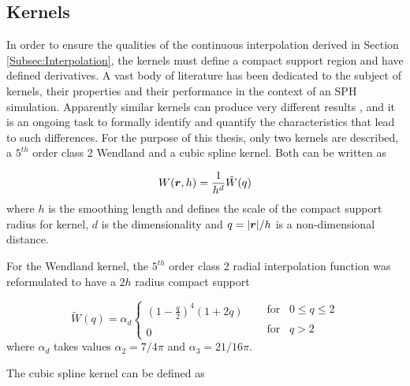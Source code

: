 \subsection{Kernels}
\label{Subsec:Kernels}

In order to ensure the qualities of the continuous interpolation derived in Section \ref{Subsec:Interpolation}, the kernels must define a compact support region and have defined derivatives. A vast body of literature has been dedicated to the subject of kernels, their properties and their performance in the context of an \ac{SPH} simulation. Apparently similar kernels can produce very different results \citep{Monaghan-2005, Macia-2011,Violeau-2012}, and it is an ongoing task to formally identify and quantify the characteristics that lead to such differences. For the purpose of this thesis, only two kernels are described, a $5^{th}$ order class 2 Wendland \citep{Wendland-1995} and a cubic spline kernel. Both can be written as 

% 
\begin{equation} \label{eq:Kernel_general}
	W(\boldsymbol{r},h)=\frac{1}{h^d}\tilde{W}(q)
\end{equation}
%
where $h$ is the smoothing length and defines the scale of the compact support radius for kernel, $d$ is the dimensionality and $q=|\boldsymbol{r}|/h$ is a non-dimensional distance.

For the Wendland kernel, the $5^{th}$ order class 2 radial interpolation function was reformulated to have a $2h$ radius compact support

% 
\begin{equation} \label{eq:Kernel_wendeland}
	\tilde{W}(q)=\alpha_d\left\{ {\begin{array}{*{20}{c}}
  {(1-\frac{q}{2})^4(1+2q)} \\\\
  0 
\end{array}} \right.
\;\;\;\;\
\begin{array}{*{20}{c}}
  \text{for}\;\;\;{0 \leq q \leq 2} \\\\
  \text{for}\;\;\;{q > 2} 
\end{array}
\end{equation}
%
where $\alpha_d$ takes values $\alpha_2=7/4\pi$ and $\alpha_3=21/16\pi$. 

The cubic spline kernel can be defined as 

